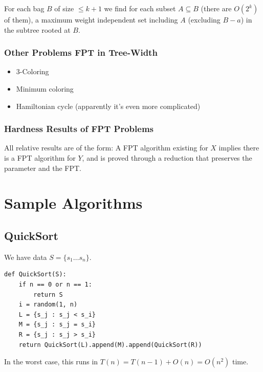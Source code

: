                     For each bag $B$ of size $\le k + 1$ we find for each subset $A \subseteq B$ (there are $O(2^k)$ of them), a maximum weight independent set including $A$ (excluding $B - a$) in the subtree rooted at $B$.
                \subsection{Other Problems FPT in Tree-Width} %
                \label{sub:other_problems_fpt_in_tree_width}
                    \begin{itemize}
                        \item 3-Coloring
                        \item Minimum coloring
                        \item Hamiltonian cycle (apparently it's even more complicated)
                    \end{itemize}
                \subsection{Hardness Results of FPT Problems} %
                \label{sub:hardness_results_of_fpt_problems}
                    All relative results are of the form:
                    A FPT algorithm existing for $X$ implies there is a FPT algorithm for $Y$, and is proved through a reduction that preserves the parameter and the FPT.
\newpage
\appendix
    \chapter{Sample Algorithms} %
    \label{cha:sample_algorithms}
        \section{QuickSort} %
        \label{sec:quicksort}
            We have data $S = \{ s_1 \ldots s_n \}$.
            \begin{lstlisting}
def QuickSort(S):
    if n == 0 or n == 1:
        return S
    i = random(1, n)
    L = {s_j : s_j < s_i}
    M = {s_j : s_j = s_i}
    R = {s_j : s_j > s_i}
    return QuickSort(L).append(M).append(QuickSort(R))
            \end{lstlisting}
            In the worst case, this runs in $T(n) = T(n-1) + O(n) = O(n^2)$ time.

